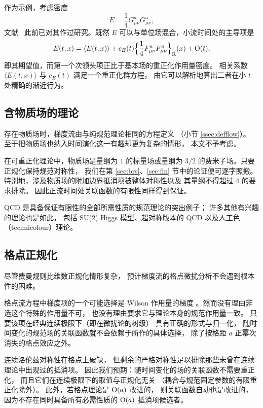 作为示例，考虑密度
\begin{equation}
   E=\frac{1}{4}G_{\mu\nu}^aG_{\mu\nu}^a,
   \label{eq:8.5}
\end{equation}
文献~\cite{WilsonFlow} 此前已对其作过研究。既然 $E$
可以与单位场混合，小流时间处的主导项是
\begin{align}
   E(t,x)=\langle E(t,x)\rangle+c_E(t)
   \Bigl\{\frac{1}{4}F^a_{\mu\nu}F^a_{\mu\nu}\Bigr\}_{\mathrm{R}}(x)+\mathrm{O}(t),
   \label{eq:8.6}
\end{align}
即其期望值，而第一个次领头项正比于基本场的重正化作用量密度。
相关系数 $\langle E(t,x)\rangle$ 与 $c_E(t)$ 满足一个重正化群方程，
由它可以解析地算出二者在小 $t$ 处精确的渐近行为。

\subsection{含物质场的理论}

存在物质场时，梯度流由与纯规范理论相同的方程定义
（小节 \ref{ssec:defflow}）。
至于把物质场也纳入时间演化这一有趣却更为复杂的情形，
本文不予考虑。

在可重正化理论中，物质场是量纲为 $1$ 的标量场或量纲为 $3/2$
的费米子场。只要正规化保持规范对称性，
我们在第 \ref{sec:brs}、\ref{sec:fin} 节中的论证便可逐字照搬。
特别地，涉及物质场的附加边界抵消项被整体对称性以及
其量纲不得超过 $4$ 的要求排除。
因此正流时间处关联函数的有限性同样得到保证。

QCD 是具备保证有限性的全部所需性质的规范理论的突出例子；
许多其他有兴趣的理论也是如此，
包括 SU(2) Higgs 模型、超对称版本的 QCD 以及人工色（technicolour）理论。

\subsection{格点正规化}

尽管费曼规则比维数正规化情形复杂，
预计梯度流的格点微扰分析不会遇到根本性的困难。

格点流方程中梯度项的一个可能选择是 Wilson 作用量的梯度
\cite{WilsonFlow}。然而没有理由非选这个特殊的作用量不可，
也没有理由要求它与理论本身的规范作用量一致。
只要该项在经典连续极限下（即在微扰论的树级）
具有正确的形式与归一化，
随时间变化的规范场的关联函数就不会依赖于所作的具体选择，
除了按格距 $a$ 正幂次消失的格点效应之外。

连续洛伦兹对称性在格点上破缺，
但剩余的严格对称性足以排除那些未曾在连续理论中出现过的抵消项。
因此我们预期：随时间变化的场的关联函数不需要重正化，
而且它们在连续极限下的取值与正规化无关
（耦合与规范固定参数的有限重正化除外）。
此外，若格点理论是 $\mathrm{O}(a)$ 改进的，
则关联函数自动也是改进的，
因为不存在同时具备所有必需性质的 $\mathrm{O}(a)$ 抵消项候选者。
